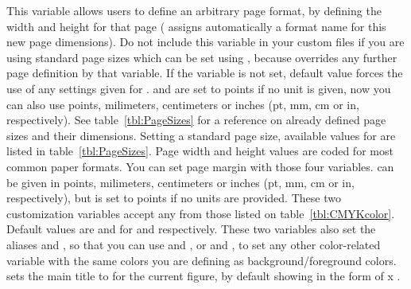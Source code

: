 %
%
%
%
   { \label{sec:pagebbox} This variable allows users to define an arbitrary page format, by defining the width and height for that page ({\prog} assigns automatically a format name for this new page dimensions). Do not include this variable in your custom files if you are using standard page sizes which can be set using , because  overrides any further page definition by that variable. If the variable is not set, default value forces the use of any settings given for .  and  are set to points if no unit is given, now you can also use points, milimeters, centimeters or inches (pt, mm, cm or in, respectively). See table~\ref{tbl:PageSizes} for a reference on already defined page sizes and their dimensions. }
%
   { Setting a standard page size, available values for  are listed in table~\ref{tbl:PageSizes}. Page width and height values are coded for most common paper formats. }
%
%
%
%
   { You can set page margin with those four variables.  can be given in points, milimeters, centimeters or inches (pt, mm, cm or in, respectively), but is set to points if no units are provided. }
%
%
   { These two customization variables accept any  from those listed on table~\ref{tbl:CMYKcolor}. Default values are  and  for  and  respectively. These two variables also set the aliases  and , so that you can use  and , or  and , to set any other color-related variable with the same colors you are defining as background/foreground colors. }
%
   {  sets the main title to  for the current figure, by default showing  in the form of  x . }
%
